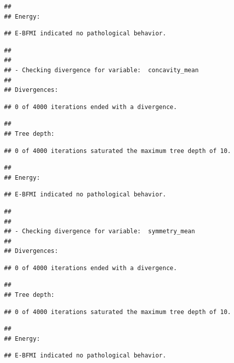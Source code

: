 \documentclass[
]{article}
\begin{document}
\begin{verbatim}
## 
## Energy:
\end{verbatim}

\begin{verbatim}
## E-BFMI indicated no pathological behavior.
\end{verbatim}

\begin{verbatim}
## 
## 
## - Checking divergence for variable:  concavity_mean 
## 
## Divergences:
\end{verbatim}

\begin{verbatim}
## 0 of 4000 iterations ended with a divergence.
\end{verbatim}

\begin{verbatim}
## 
## Tree depth:
\end{verbatim}

\begin{verbatim}
## 0 of 4000 iterations saturated the maximum tree depth of 10.
\end{verbatim}

\begin{verbatim}
## 
## Energy:
\end{verbatim}

\begin{verbatim}
## E-BFMI indicated no pathological behavior.
\end{verbatim}

\begin{verbatim}
## 
## 
## - Checking divergence for variable:  symmetry_mean 
## 
## Divergences:
\end{verbatim}

\begin{verbatim}
## 0 of 4000 iterations ended with a divergence.
\end{verbatim}

\begin{verbatim}
## 
## Tree depth:
\end{verbatim}

\begin{verbatim}
## 0 of 4000 iterations saturated the maximum tree depth of 10.
\end{verbatim}

\begin{verbatim}
## 
## Energy:
\end{verbatim}

\begin{verbatim}
## E-BFMI indicated no pathological behavior.
\end{verbatim}
\end{document}
